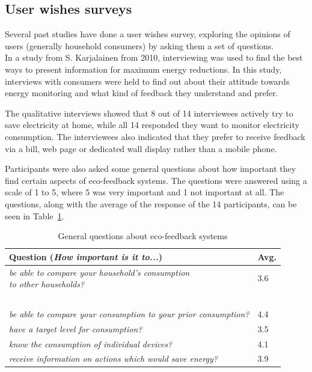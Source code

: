 \documentclass[journal]{vgtc}                %
\begin{document}
\subsection{User wishes surveys}
Several past studies have done a user wishes survey, exploring the opinions of users (generally household consumers) by asking them a set of questions. \\

In a study from S. Karjalainen\cite{karjalainen2011consumer} from 2010, interviewing was used to find the best ways to present information for maximum energy reductions. In this study, interviews with consumers were held to find out about their attitude towards energy monitoring and what kind of feedback they understand and prefer.

The qualitative interviews showed that 8 out of 14 interviewees actively try to save electricity at home, while all 14 responded they want to monitor electricity consumption. The interviewees also indicated that they prefer to receive feedback via a bill, web page or dedicated wall display rather than a mobile phone.

Participants were also asked some general questions about how important they find certain aspects of eco-feedback systems. The questions were answered using a scale of 1 to 5, where 5 was very important and 1 not important at all. The questions, along with the average of the response of the 14 participants, can be seen in Table~\ref{prototypesquestions}.

\begin{table}
  \caption{General questions about eco-feedback systems}
  \label{prototypesquestions}
  \scriptsize
  \begin{center}
    \begin{tabular}{|ll|}
    \hline
       Question (\textit{How important is it to...}) & Avg. \\ \hline
       \pbox{20cm}{\textit{be able to compare your household's consumption}\\\textit{to other households?}} & 3.6 \\ ~\\[-0.25cm]
       \textit{be able to compare your consumption to your prior consumption?} & 4.4 \\ 
       \textit{have a target level for consumption?} & 3.5 \\ 
       \textit{know the consumption of individual devices?} & 4.1 \\ 
       \textit{receive information on actions which would save energy?} & 3.9 \\
       \hline
    \end{tabular}
  \end{center}
\end{table}
\end{document}
